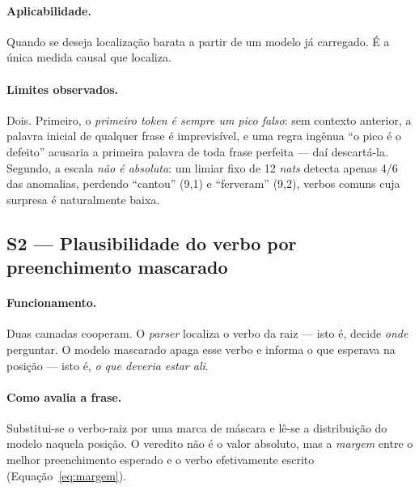 \documentclass[11pt,a4paper]{article}
\begin{document}
\paragraph{Aplicabilidade.} Quando se deseja localização barata a partir de um modelo já carregado.
É a única medida causal que localiza.

\paragraph{Limites observados.} Dois. Primeiro, o \emph{primeiro token é sempre um pico falso}: sem
contexto anterior, a palavra inicial de qualquer frase é imprevisível, e uma regra ingênua ``o pico
é o defeito'' acusaria a primeira palavra de toda frase perfeita --- daí descartá-la. Segundo, a
escala \emph{não é absoluta}: um limiar fixo de 12 \textit{nats} detecta apenas 4/6 das anomalias,
perdendo ``cantou'' (9,1) e ``ferveram'' (9,2), verbos comuns cuja surpresa é naturalmente baixa.

\subsection{S2 --- Plausibilidade do verbo por preenchimento mascarado}

\paragraph{Funcionamento.} Duas camadas cooperam. O \textit{parser} localiza o verbo da raiz --- isto
é, decide \emph{onde} perguntar. O modelo mascarado apaga esse verbo e informa o que esperava na
posição --- isto é, \emph{o que deveria estar ali}.

\paragraph{Como avalia a frase.} Substitui-se o verbo-raiz por uma marca de máscara e lê-se a
distribuição do modelo naquela posição. O veredito não é o valor absoluto, mas a \emph{margem} entre
o melhor preenchimento esperado e o verbo efetivamente escrito (Equação~\ref{eq:margem}).
\end{document}

